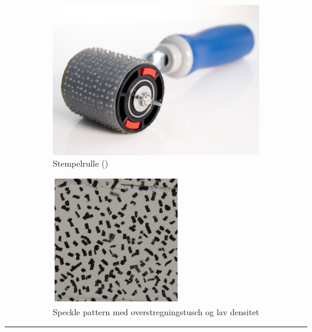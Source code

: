 \begin{figure}[H]
    \centering
    \begin{subfigure}{0.46\textwidth}
        \centering
        \includegraphics[width=.98\linewidth]{Sections/2 Problemanalyse/Media/Roller.png}
        \caption{Stempelrulle (\cite{CorrelatedSolutions2025VICCorrelation})}
        \label{fig: Stempelrulle}
    \end{subfigure}
    \begin{subfigure}{0.49\textwidth}
        \centering
         \includegraphics[width=0.7\linewidth]{Sections/2 Problemanalyse/Media/Tusch.png}
         \caption{Speckle pattern med overstregningstusch og lav densitet \parencite{HoseinSalmanpour2013PDFWalls}}
        \label{SpeckleTusch}
    \end{subfigure}
    \caption{}
    \label{fig:rulle og tush}
\end{figure} \plainbreak{-0.5}



